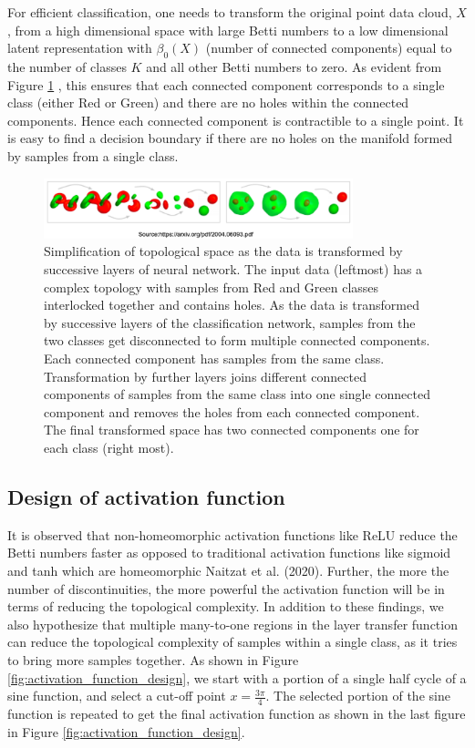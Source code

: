 \documentclass[wcp]{jmlr}
\begin{document}
For efficient classification, one needs to transform the original point data cloud, $X$,  from a high dimensional space with large Betti numbers to a low dimensional latent representation with  $\beta_0(X)$ (number of connected components) equal to the number of classes $K$ and all other Betti numbers to zero. As evident from Figure \ref{fig:topological_simplication_layer_by_layer} , this ensures that each connected component  corresponds to a single class (either Red or Green) and there are no holes within the connected components. Hence  each connected component is contractible  to a single point. It is easy to find a decision boundary if there are no holes on the manifold formed by samples from a  single class.

\begin{figure}[htp]
\begin{center}
\includegraphics[width=0.8\textwidth]{images/topological_simplication_layer_by_layer.png}
\caption{Simplification of topological space as the data is transformed by successive layers of neural network. The input data (leftmost) has a complex topology with samples from Red and Green classes interlocked together and contains holes. As the data is transformed by successive layers of the classification network, samples from the two classes get disconnected to form multiple connected components. Each connected component has samples from the same class. Transformation by further layers joins different connected components of samples from the same class into one single connected component and  removes the holes from each connected component. The final transformed space has two connected components one for each class (right most).
}\label{fig:topological_simplication_layer_by_layer}
\end{center}
\end{figure}

\subsection{Design of activation function} \label{sec:design_of_activation_function}
It is observed that non-homeomorphic activation functions like ReLU reduce the Betti numbers faster as opposed to traditional  activation functions like sigmoid and tanh which are  homeomorphic Naitzat et al. (2020). Further, the more the number of discontinuities, the more powerful the activation function will be in terms of reducing the topological complexity. In addition to these findings, we also hypothesize that multiple many-to-one regions in the layer transfer function can reduce the topological complexity  of samples within a single class, as it tries to bring more samples together. As shown in Figure \ref{fig:activation_function_design}, we start with  a portion of a single half cycle of a sine function, and select a cut-off point $x=\frac{3\pi}{4}$. The selected portion of the sine function is repeated to get the final activation function as shown in the last figure in Figure \ref{fig:activation_function_design}.
\end{document}
